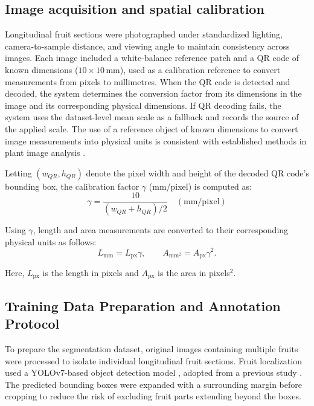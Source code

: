 \documentclass[final,5p,times,twocolumn]{elsarticle}
\begin{document}
\subsection*{Image acquisition and spatial calibration}

Longitudinal fruit sections were photographed under standardized lighting, camera-to-sample distance, and viewing angle to maintain consistency across images. Each image included a white-balance reference patch and a QR code of known dimensions ($10 \times 10$\,mm), used as a calibration reference to convert measurements from pixels to millimetres. When the QR code is detected and decoded, the system determines the conversion factor from its dimensions in the image and its corresponding physical dimensions. If QR decoding fails, the system uses the dataset-level mean scale as a fallback and records the source of the applied scale. The use of a reference object of known dimensions to convert image measurements into physical units is consistent with established methods in plant image analysis \cite{cass}.

Letting $(w_{QR}, h_{QR})$ denote the pixel width and height of the decoded QR code's bounding box, the calibration factor $\gamma$ (mm/pixel) is computed as:
\begin{equation}
    \gamma = \frac{10}{(w_{QR} + h_{QR})/2} \quad (\text{mm/pixel})
\end{equation}

Using $\gamma$, length and area measurements are converted to their corresponding physical units as follows:
\begin{equation}
 L_{\mathrm{mm}} = L_{\mathrm{px}} \gamma,\qquad
 A_{\mathrm{mm}^2} = A_{\mathrm{px}} \gamma^{2}.
\end{equation}




\noindent Here, $L_{\mathrm{px}}$ is the length in pixels and $A_{\mathrm{px}}$ is the area in pixels$^2$.


\subsection*{Training Data Preparation and Annotation Protocol}
To prepare the segmentation dataset, original images containing multiple fruits were processed to isolate individual longitudinal fruit sections. Fruit localization used a YOLOv7-based object detection model \cite{yolov7}, adopted from a previous study \cite{ver1}. The predicted bounding boxes were expanded with a surrounding margin before cropping to reduce the risk of excluding fruit parts extending beyond the boxes.
\end{document}
